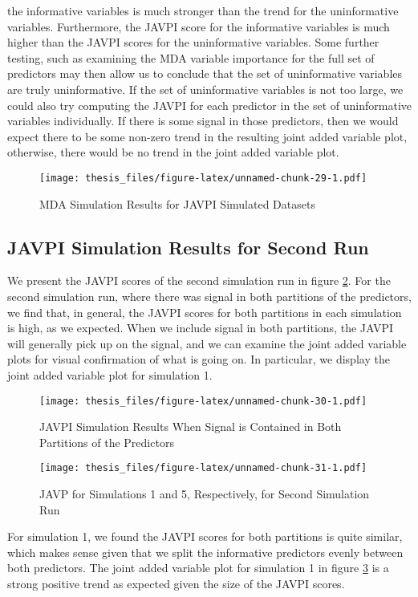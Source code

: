 \documentclass[12pt,twoside]{reedthesis}
\theoremstyle{definition}
\theoremstyle{definition}
\theoremstyle{definition}
\theoremstyle{remark}
\begin{document}
the informative variables is much stronger than the trend for the
uninformative variables. Furthermore, the JAVPI score for the
informative variables is much higher than the JAVPI scores for the
uninformative variables. Some further testing, such as examining the MDA
variable importance for the full set of predictors may then allow us to
conclude that the set of uninformative variables are truly
uninformative. If the set of uninformative variables is not too large,
we could also try computing the JAVPI for each predictor in the set of
uninformative variables individually. If there is some signal in those
predictors, then we would expect there to be some non-zero trend in the
resulting joint added variable plot, otherwise, there would be no trend
in the joint added variable plot. \par 
\begin{figure}
\centering
\texttt{[image: thesis\_files/figure-latex/unnamed-chunk-29-1.pdf]}
\caption{\label{fig:unnamed-chunk-29}\label{MDAforJAVPI} MDA Simulation
Results for JAVPI Simulated Datasets}
\end{figure}
\subsection{JAVPI Simulation Results for Second
Run}\label{javpi-simulation-results-for-second-run}

We present the JAVPI scores of the second simulation run in figure
\ref{JAVPItwosig}. For the second simulation run, where there was signal
in both partitions of the predictors, we find that, in general, the
JAVPI scores for both partitions in each simulation is high, as we
expected. When we include signal in both partitions, the JAVPI will
generally pick up on the signal, and we can examine the joint added
variable plots for visual confirmation of what is going on. In
particular, we display the joint added variable plot for simulation 1.
\par 
\begin{figure}
\centering
\texttt{[image: thesis\_files/figure-latex/unnamed-chunk-30-1.pdf]}
\caption{\label{fig:unnamed-chunk-30}\label{JAVPItwosig}JAVPI Simulation
Results When Signal is Contained in Both Partitions of the Predictors}
\end{figure}
\begin{figure}
\centering
\texttt{[image: thesis\_files/figure-latex/unnamed-chunk-31-1.pdf]}
\caption{\label{fig:unnamed-chunk-31}\label{siml1and5plots}JAVP for
Simulations 1 and 5, Respectively, for Second Simulation Run}
\end{figure}
For simulation 1, we found the JAVPI scores for both partitions is quite
similar, which makes sense given that we split the informative
predictors evenly between both predictors. The joint added variable plot
for simulation 1 in figure \ref{siml1and5plots} is a strong positive
trend as expected given the size of the JAVPI scores. \par 
\end{document}
